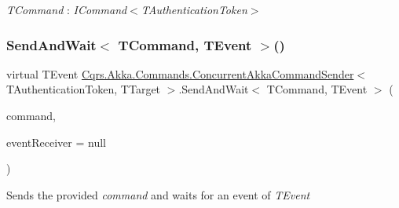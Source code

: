 \begin{Desc}
\item[Type Constraints]\begin{description}
\item[{\em T\+Command} : {\em I\+Command$<$T\+Authentication\+Token$>$}]\end{description}
\end{Desc}
\mbox{\label{classCqrs_1_1Akka_1_1Commands_1_1ConcurrentAkkaCommandSender_a655aa63a47944035c113f9668bcf1284_a655aa63a47944035c113f9668bcf1284}} 
\subsubsection{\texorpdfstring{Send\+And\+Wait$<$ T\+Command, T\+Event $>$()}{SendAndWait< TCommand, TEvent >()}\hspace{0.1cm}{\footnotesize\ttfamily [1/6]}}
{\footnotesize\ttfamily virtual T\+Event \hyperlink{classCqrs_1_1Akka_1_1Commands_1_1ConcurrentAkkaCommandSender}{Cqrs.\+Akka.\+Commands.\+Concurrent\+Akka\+Command\+Sender}$<$ T\+Authentication\+Token, T\+Target $>$.Send\+And\+Wait$<$ T\+Command, T\+Event $>$ (\begin{DoxyParamCaption}\item[{T\+Command}]{command,  }\item[{\hyperlink{interfaceCqrs_1_1Events_1_1IEventReceiver}{I\+Event\+Receiver}$<$ T\+Authentication\+Token $>$}]{event\+Receiver = {\ttfamily null} }\end{DoxyParamCaption})\hspace{0.3cm}{\ttfamily [virtual]}}



Sends the provided {\itshape command}  and waits for an event of {\itshape T\+Event}  


